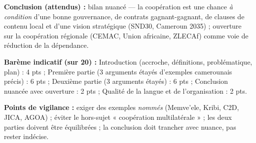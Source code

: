 \documentclass[11pt]{article}
\begin{document}
\begin{corrige}
\textbf{Conclusion (attendus) :} bilan nuancé — la coopération est une chance \emph{à condition} d'une bonne gouvernance, de contrats gagnant-gagnant, de clauses de contenu local et d'une vision stratégique (SND30, Cameroun 2035) ; ouverture sur la coopération régionale (CEMAC, Union africaine, ZLECAf) comme voie de réduction de la dépendance.

\textbf{Barème indicatif (sur 20) :} Introduction (accroche, définitions, problématique, plan) : 4 pts ; Première partie (3 arguments étayés d'exemples camerounais précis) : 6 pts ; Deuxième partie (3 arguments étayés) : 6 pts ; Conclusion nuancée avec ouverture : 2 pts ; Qualité de la langue et de l'organisation : 2 pts.

\textbf{Points de vigilance :} exiger des exemples \emph{nommés} (Memve'ele, Kribi, C2D, JICA, AGOA) ; éviter le hors-sujet « coopération multilatérale » ; les deux parties doivent être équilibrées ; la conclusion doit trancher avec nuance, pas rester indécise.
\end{corrige}
\end{document}

